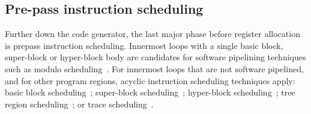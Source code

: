 \subsection{Pre-pass instruction scheduling}

Further down the code generator, the last major phase before register allocation
is prepass instruction scheduling. Innermost loops with a single basic block,
super-block or hyper-block body are candidates for software pipelining
techniques such as modulo scheduling~\cite{Rau:1996:IJPP}. For innermost loops
that are not software pipelined, and for other program regions, acyclic
instruction scheduling techniques apply: basic block scheduling~\cite{Goodman:1988:ICS}; super-block scheduling~\cite{Hwu:1993:JS}; hyper-block
scheduling~\cite{Mahlke:1992:ECS:144965.144998}; tree region scheduling~\cite{Havanki:1998:HPCA}; or trace scheduling~\cite{Lowney:1993:JS}.

